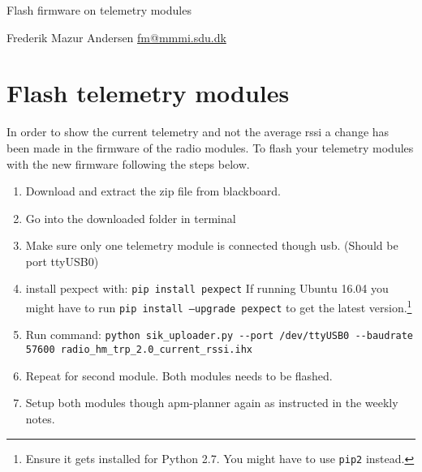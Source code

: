 \documentclass[a4paper,10pt,fleqn]{article}
\begin{document}
\vspace*{5mm}

\LARGE
\begin{center}Flash firmware on telemetry modules

\normalsize
\vspace{2mm}
Frederik Mazur Andersen \href{mailto:fm@mmmi.sdu.dk}{fm@mmmi.sdu.dk}

\vspace {3mm}
\end{center}

\normalsize
\vspace{5mm}
\FloatBarrier


\section{Flash telemetry modules}
In order to show the current telemetry and not the average rssi a change has been made in the firmware of the radio modules. To flash your telemetry modules with the new firmware following the steps below.

\begin{enumerate}
\item Download and extract the zip file from blackboard.
\item Go into the downloaded folder in terminal
\item Make sure only one telemetry module is connected though usb. (Should be port ttyUSB0)
\item install pexpect with: \texttt{pip install pexpect} If running Ubuntu 16.04 you might have to run \texttt{pip install --upgrade pexpect} to get the latest version.\footnote{Ensure it gets installed for Python 2.7. You might have to use \texttt{pip2} instead.} 
\item Run command: \texttt{python sik\_uploader.py -{}-port /dev/ttyUSB0 -{}-baudrate 57600 radio\_hm\_trp\_2.0\_current\_rssi.ihx}
\item Repeat for second module. Both modules needs to be flashed. 
\item Setup both modules though apm-planner again as instructed in the weekly notes. 
\end{enumerate}


%
% 
\end{document}
